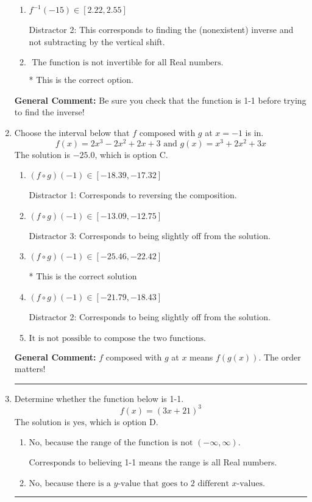 \documentclass{extbook}[14pt]
\newcommand{\litem}[1]{\item #1

\rule{\textwidth}{0.4pt}}
\begin{document}
\begin{enumerate}
{\begin{enumerate}[label=\Alph*.]
 Distractor 3: This corresponds to finding the (nonexistent) inverse and dividing by a negative.
\item \( f^{-1}(-15) \in [2.22, 2.55] \)

 Distractor 2: This corresponds to finding the (nonexistent) inverse and not subtracting by the vertical shift.
\item \( \text{ The function is not invertible for all Real numbers. } \)

* This is the correct option.
\end{enumerate}

\textbf{General Comment:} Be sure you check that the function is 1-1 before trying to find the inverse!
}
\litem{
Choose the interval below that $f$ composed with $g$ at $x=-1$ is in.
\[ f(x) = 2x^{3} -2 x^{2} +2 x + 3 \text{ and } g(x) = x^{3} +2 x^{2} +3 x \]The solution is \( -25.0 \), which is option C.\begin{enumerate}[label=\Alph*.]
\item \( (f \circ g)(-1) \in [-18.39, -17.32] \)

 Distractor 1: Corresponds to reversing the composition.
\item \( (f \circ g)(-1) \in [-13.09, -12.75] \)

 Distractor 3: Corresponds to being slightly off from the solution.
\item \( (f \circ g)(-1) \in [-25.46, -22.42] \)

* This is the correct solution
\item \( (f \circ g)(-1) \in [-21.79, -18.43] \)

 Distractor 2: Corresponds to being slightly off from the solution.
\item \( \text{It is not possible to compose the two functions.} \)


\end{enumerate}

\textbf{General Comment:} $f$ composed with $g$ at $x$ means $f(g(x))$. The order matters!
}
\litem{
Determine whether the function below is 1-1.
\[ f(x) = (3 x + 21)^3 \]The solution is \( \text{yes} \), which is option D.\begin{enumerate}[label=\Alph*.]
\item \( \text{No, because the range of the function is not $(-\infty, \infty)$.} \)

Corresponds to believing 1-1 means the range is all Real numbers.
\item \( \text{No, because there is a $y$-value that goes to 2 different $x$-values.} \)


\end{enumerate}}
\end{enumerate}
\end{document}
